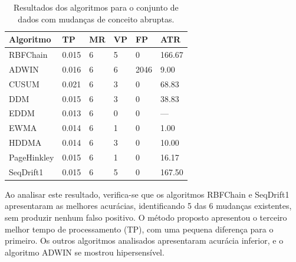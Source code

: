 \documentclass[msc, classic, a4paper]{ufbathesis}
\begin{document}
    \begin{table}[ht]
    \centering
    \caption{Resultados dos algoritmos para o conjunto de dados com mudanças de conceito abruptas.}
    \label{tbl:exp2}
    \begin{tabular}{llllll}

\toprule
Algoritmo              & TP                     & MR                     & VP                     & FP                     & ATR                    \\ 
\midrule
RBFChain               & 0.015                  & 6                      & 5                      & 0                      & 166.67                 \\ 
ADWIN                  & 0.016                  & 6                      & 6                      & 2046                   & 9.00                   \\ 
CUSUM                  & 0.021                  & 6                      & 3                      & 0                      & 68.83                  \\ 
DDM                    & 0.015                  & 6                      & 3                      & 0                      & 38.83                  \\ 
EDDM                   & 0.013                  & 6                      & 0                      & 0                      & ---                    \\ 
EWMA                   & 0.014                  & 6                      & 1                      & 0                      & 1.00                   \\ 
HDDMA                  & 0.014                  & 6                      & 3                      & 0                      & 10.00                    \\ 
PageHinkley            & 0.015                  & 6                      & 1                      & 0                      & 16.17                  \\ 
SeqDrift1              & 0.015                  & 6                      & 5                      & 0                      & 167.50                 \\ 
\bottomrule

    \end{tabular}
    \end{table}


Ao analisar este resultado, verifica-se que os algoritmos RBFChain e SeqDrift1 apresentaram as melhores acurácias, identificando 5 das 6 mudanças existentes, sem produzir nenhum falso positivo.
O método proposto apresentou o terceiro melhor tempo de processamento (TP), com uma pequena diferença para o primeiro.
Os outros algoritmos analisados apresentaram acurácia inferior, e o algoritmo ADWIN se mostrou hipersensível.
\end{document}
